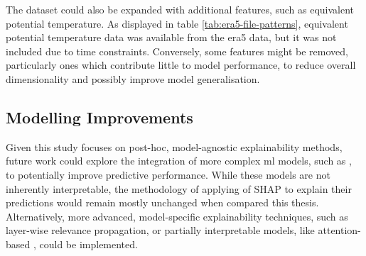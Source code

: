 The dataset could also be expanded with additional features, such as equivalent potential temperature. As displayed in table \ref{tab:era5-file-patterns}, equivalent potential temperature data was available from the \acrshort{era5} data, but it was not included due to time constraints. Conversely, some features might be removed, particularly ones which contribute little to model performance, to reduce overall dimensionality and possibly improve model generalisation.

\subsection{Modelling Improvements}

Given this study focuses on post-hoc, model-agnostic explainability methods, future work could explore the integration of more complex \acrshort{ml} models, such as , to potentially improve predictive performance. While these models are not inherently interpretable, the methodology of applying of SHAP to explain their predictions would remain mostly unchanged when compared this thesis. Alternatively, more advanced, model-specific explainability techniques, such as layer-wise relevance propagation, or partially interpretable models, like attention-based , could be implemented.
